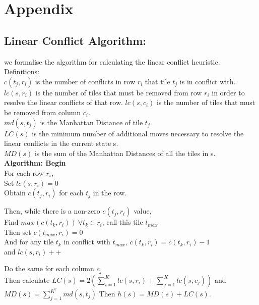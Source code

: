 \documentclass{llncs}
\begin{document}
\newpage




\newpage
\section{Appendix}

\subsection{Linear Conflict Algorithm:}

we formalise the algorithm for calculating the linear conflict heuristic. \\
Definitions: \\
$c(t_j,r_i)$ is the number of conflicts in row $r_i$ that tile $t_j$ is in conflict with. \\
$lc(s, r_i)$ is the number of tiles that must be removed from row $r_i$ in order to resolve the linear conflicts of that row. $lc(s, c_i)$ is the number of tiles that must be removed from column $c_i$.  \\
$md(s, t_j)$ is the Manhattan Distance of tile $t_j$. \\
$LC(s)$ is the minimum number of additional moves necessary to resolve the linear conflicts in the current state s.\\
$MD(s)$ is the sum of the Manhattan Distances of all the tiles in s. \\

\textbf{Algorithm: Begin} \\
 
For each row $r_i$, \\
Set $lc(s, r_i) = 0$ \\
Obtain $c(t_j,r_i)$ for each $t_j$ in the row.

Then, while there is a non-zero $c(t_j,r_i)$ value, \\
    Find $max(c(t_k,r_i)) \ \forall t_k \in r_i$, call this tile $t_{max}$  \\
    Then set $c(t_{max},r_i) = 0$ \\
    And for any tile $t_k$ in conflict with $t_{max}$, $c(t_k,r_i) = c(t_k,r_i) - 1$ \\
    and $lc(s, r_i)++$

Do the same for each column $c_j$ \\
Then calculate $LC(s) = 2(\sum^K_{i=1} lc(s,r_i) + \sum^K_{j=1} lc(s,c_j))$
and  $MD(s) = \sum^{K^2}_{j=1}md(s,t_j)$
Then  $h(s) = MD(s) + LC(s)$. \\
\end{document}
